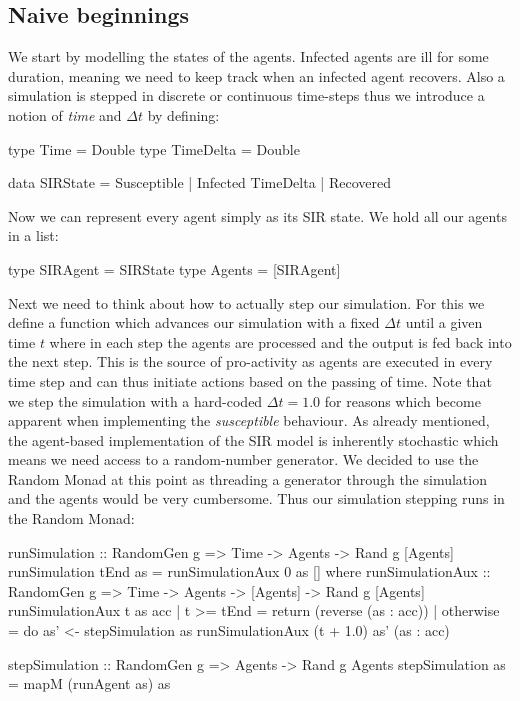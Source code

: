\subsection{Naive beginnings}
\label{sec:naive_beginnigs}
We start by modelling the states of the agents. Infected agents are ill for some duration, meaning we need to keep track when an infected agent recovers. Also a simulation is stepped in discrete or continuous time-steps thus we introduce a notion of \textit{time} and $\Delta t$ by defining:

\begin{HaskellCode}
type Time      = Double
type TimeDelta = Double

data SIRState = Susceptible | Infected TimeDelta | Recovered
\end{HaskellCode}

Now we can represent every agent simply as its SIR state. We hold all our agents in a list:
\begin{HaskellCode}
type SIRAgent = SIRState
type Agents   = [SIRAgent]
\end{HaskellCode}

Next we need to think about how to actually step our simulation. For this we define a function which advances our simulation with a fixed $\Delta t$ until a given time $t$ where in each step the agents are processed and the output is fed back into the next step. This is the source of pro-activity as agents are executed in every time step and can thus initiate actions based on the passing of time. Note that we step the simulation with a hard-coded $\Delta t = 1.0$ for reasons which become apparent when implementing the \textit{susceptible} behaviour.
As already mentioned, the agent-based implementation of the SIR model is inherently stochastic which means we need access to a random-number generator. We decided to use the Random Monad at this point as threading a generator through the simulation and the agents would be very cumbersome. Thus our simulation stepping runs in the Random Monad:

\begin{HaskellCode}
runSimulation :: RandomGen g 
  => Time -> Agents -> Rand g [Agents]
runSimulation tEnd as = runSimulationAux 0 as []
  where
    runSimulationAux :: RandomGen g 
      => Time -> Agents -> [Agents] -> Rand g [Agents]
    runSimulationAux t as acc
      | t >= tEnd = return (reverse (as : acc))
      | otherwise = do
        as' <- stepSimulation as 
        runSimulationAux (t + 1.0) as' (as : acc)

stepSimulation :: RandomGen g => Agents -> Rand g Agents
stepSimulation as = mapM (runAgent as) as
\end{HaskellCode}

